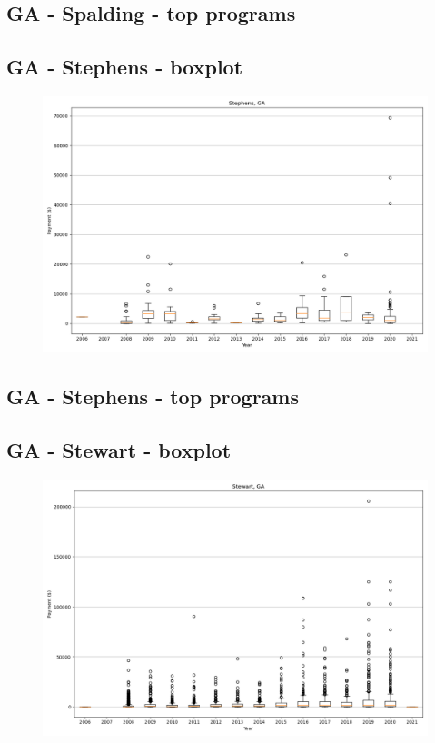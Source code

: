 \subsection*{GA - Spalding - top programs}

\newpage
\subsection*{GA - Stephens - boxplot}
\begin{figure}[h]
\centering
\includegraphics[width=7in]{../output/boxplots/counties/Stephens-GA_boxplot.png}
\end{figure}


\subsection*{GA - Stephens - top programs}

\newpage
\subsection*{GA - Stewart - boxplot}
\begin{figure}[h]
\centering
\includegraphics[width=7in]{../output/boxplots/counties/Stewart-GA_boxplot.png}
\end{figure}


